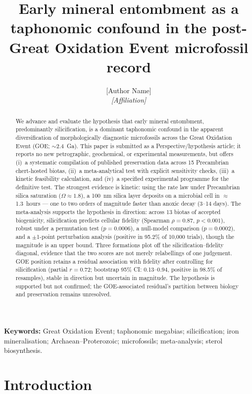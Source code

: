 \documentclass[11pt]{article}
\title{\vspace{-1.0cm}\textbf{Early mineral entombment as a taphonomic confound in the
post-Great Oxidation Event microfossil record}}
\author{[Author Name]\\
\small\textit{[Affiliation]}}
\date{}
\begin{document}
\maketitle

\begin{abstract}
\noindent We advance and evaluate the hypothesis that early mineral entombment, predominantly
silicification, is a dominant taphonomic confound in the apparent diversification of morphologically
diagnostic microfossils across the Great Oxidation Event (GOE; $\sim$2.4~Ga). This paper is submitted
as a Perspective/hypothesis article; it reports no new petrographic, geochemical, or experimental
measurements, but offers (i)~a systematic compilation of published preservation data across 15
Precambrian chert-hosted biotas, (ii)~a meta-analytical test with explicit sensitivity checks,
(iii)~a kinetic feasibility calculation, and (iv)~a specified experimental programme for the
definitive test. The strongest evidence is kinetic: using the \citet{Rimstidt1980} rate law under
Precambrian silica saturation ($\Omega \approx 1.8$), a 100~nm silica layer deposits on a microbial
cell in $\approx$1.3~hours --- one to two orders of magnitude faster than anoxic decay (3--14 days).
The meta-analysis supports the hypothesis in direction: across 13 biotas of accepted biogenicity,
silicification predicts cellular fidelity (Spearman $\rho = 0.87$, $p < 0.001$), robust under a
permutation test ($p = 0.0006$), a null-model comparison ($p = 0.0002$), and a $\pm$1-point
perturbation analysis (positive in 95.2\% of 10{,}000 trials), though the magnitude is an upper
bound. Three formations plot off the silicification--fidelity diagonal, evidence that the two scores
are not merely relabellings of one judgement. GOE position retains a residual association with
fidelity after controlling for silicification (partial $r = 0.72$; bootstrap 95\% CI: 0.13--0.94,
positive in 98.5\% of resamples), stable in direction but uncertain in magnitude. The hypothesis is
supported but not confirmed; the GOE-associated residual's partition between biology and preservation
remains unresolved.
\end{abstract}

\noindent\textbf{Keywords:} Great Oxidation Event; taphonomic megabias; silicification; iron
mineralisation; Archaean--Proterozoic; microfossils; meta-analysis; sterol biosynthesis.

\section{Introduction}
\end{document}
